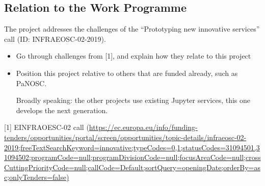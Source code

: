 \subsection{Relation to the Work Programme}

The \TheProject project addresses the challenges of the ``Prototyping
new innovative services'' call (ID: INFRAEOSC-02-2019).

\begin{itemize}
\item Go through challenges from [1], and explain how they relate to
  this project
\item Position this project relative to others that are funded
  already, such as PaNOSC.

  Broadly speaking: the other projects use existing Jupyter services,
  this one develops the next generation.
\end{itemize}

[1] EINFRAOESC-02 call (\url{https://ec.europa.eu/info/funding-tenders/opportunities/portal/screen/opportunities/topic-details/infraeosc-02-2019;freeTextSearchKeyword=innovative;typeCodes=0,1;statusCodes=31094501,31094502;programCode=null;programDivisionCode=null;focusAreaCode=null;crossCuttingPriorityCode=null;callCode=Default;sortQuery=openingDate;orderBy=asc;onlyTenders=false)}

